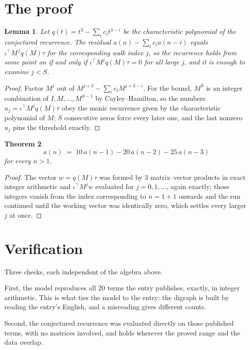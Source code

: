 \documentclass[11pt,a4paper]{article}
\theoremstyle{plain}
\newtheorem{theorem}{Theorem}
\newtheorem{lemma}[theorem]{Lemma}
\theoremstyle{definition}
\begin{document}
\section{The proof}

\begin{lemma}\label{lem:crit}
Let $q(t)=t^{3}-\sum_i c_it^{3-i}$ be the characteristic polynomial of the
conjectured recurrence. The residual $a(n)-\sum_ic_ia(n-i)$ equals
$\iota^{\!\top}M^{\,j}q(M)\tau$ for the corresponding walk index $j$, so the recurrence
holds from some point on if and only if $\iota^{\!\top}M^{j}q(M)\tau=0$ for all large $j$,
and it is enough to examine $j<S$.
\end{lemma}

\begin{proof}
Factor $M^{j}$ out of $M^{j+3}-\sum_ic_iM^{j+3-i}$. For the bound, $M^{S}$
is an integer combination of $I,M,\dots,M^{S-1}$ by Cayley--Hamilton, so the numbers
$u_j=\iota^{\!\top}M^{j}q(M)\tau$ obey the monic recurrence given by the characteristic
polynomial of $M$; $S$ consecutive zeros force every later one, and the last nonzero $u_j$
pins the threshold exactly.
\end{proof}

\begin{theorem}
\[
a(n)\;=\;10\,a(n-1) - 20\,a(n-2) - 25\,a(n-3)
\]
for every $n>1$.
\end{theorem}

\begin{proof}
The vector $w=q(M)\tau$ was formed by $3$ matrix--vector products in exact integer
arithmetic and $\iota^{\!\top}M^{j}w$ evaluated for $j=0,1,\dots$, again exactly; those
integers vanish from the index corresponding to $n=1+1$ onwards and the run continued
until the working vector was identically zero, which settles every larger $j$ at once.
\end{proof}

\section{Verification}

Three checks, each independent of the algebra above.

First, the model reproduces all $20$ terms the entry publishes, exactly, in integer
arithmetic. This is what ties the model to the entry: the digraph is built by reading the
entry's English, and a misreading gives different counts.

Second, the conjectured recurrence was evaluated directly on those published terms, with no
matrices involved, and holds wherever the proved range and the data overlap.
\end{document}
